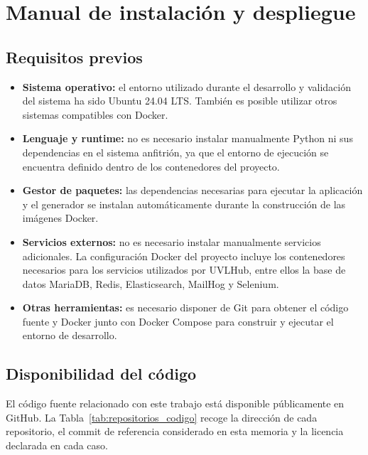\chapter{Manual de instalación y despliegue}
\label{app:manual_instalacion}

\section{Requisitos previos}
\label{sec:requisitos_previos}

\begin{itemize}
    \item \textbf{Sistema operativo:} el entorno utilizado durante el
    desarrollo y validación del sistema ha sido Ubuntu 24.04 LTS. También es
    posible utilizar otros sistemas compatibles con Docker.

    \item \textbf{Lenguaje y runtime:} no es necesario instalar manualmente
    Python ni sus dependencias en el sistema anfitrión, ya que el entorno de
    ejecución se encuentra definido dentro de los contenedores del proyecto.

    \item \textbf{Gestor de paquetes:} las dependencias necesarias para
    ejecutar la aplicación y el generador se instalan automáticamente durante
    la construcción de las imágenes Docker.

    \item \textbf{Servicios externos:} no es necesario instalar manualmente
    servicios adicionales. La configuración Docker del proyecto incluye los
    contenedores necesarios para los servicios utilizados por UVLHub, entre
    ellos la base de datos MariaDB, Redis, Elasticsearch, MailHog y Selenium.

    \item \textbf{Otras herramientas:} es necesario disponer de Git para
    obtener el código fuente y Docker junto con Docker Compose para construir y
    ejecutar el entorno de desarrollo.
\end{itemize}

\section{Disponibilidad del código}
\label{sec:disponibilidad_codigo}

El código fuente relacionado con este trabajo está disponible públicamente en
GitHub. La Tabla~\ref{tab:repositorios_codigo} recoge la dirección de cada
repositorio, el commit de referencia considerado en esta memoria y la licencia
declarada en cada caso.

